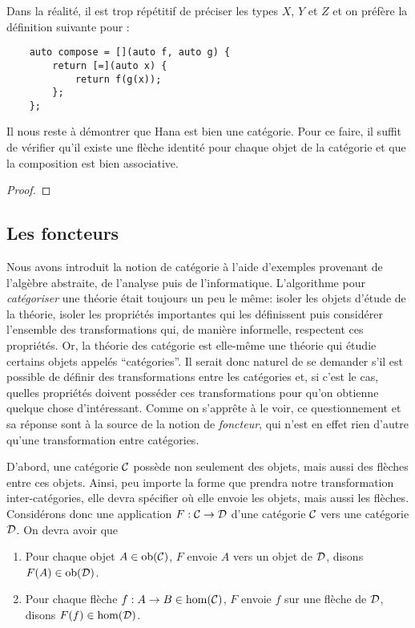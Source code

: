 Dans la réalité, il est trop répétitif de préciser les types $X$, $Y$ et $Z$
et on préfère la définition suivante pour :
\begin{verbatim}
    auto compose = [](auto f, auto g) {
        return [=](auto x) {
            return f(g(x));
        };
    };
\end{verbatim}

Il nous reste à démontrer que Hana est bien une catégorie. Pour ce faire, il
suffit de vérifier qu'il existe une flèche identité pour chaque objet de
la catégorie et que la composition est bien associative.

\begin{proof}

\end{proof}


\subsection{Les foncteurs}
Nous avons introduit la notion de catégorie à l'aide d'exemples provenant de
l'algèbre abstraite, de l'analyse puis de l'informatique. L'algorithme pour
\textit{catégoriser} une théorie était toujours un peu le même: isoler les
objets d'étude de la théorie, isoler les propriétés importantes qui les
définissent puis considérer l'ensemble des transformations qui, de manière
informelle, respectent ces propriétés. Or, la théorie des catégorie est
elle-même une théorie qui étudie certains objets appelés ``catégories''.
Il serait donc naturel de se demander s'il est possible de définir des
transformations entre les catégories et, si c'est le cas, quelles propriétés
doivent posséder ces transformations pour qu'on obtienne quelque chose
d'intéressant. Comme on s'apprête à le voir, ce questionnement et sa
réponse sont à la source de la notion de \textit{foncteur}, qui n'est
en effet rien d'autre qu'une transformation entre catégories.

D'abord, une catégorie $\mathcal{C}$ possède non seulement des objets, mais aussi
des flèches entre ces objets. Ainsi, peu importe la forme que prendra notre
transformation inter-catégories, elle devra spécifier où elle envoie les
objets, mais aussi les flèches. Considérons donc une application $F : \mathcal{C} \to \mathcal{D}$
d'une catégorie $\mathcal{C}$ vers une catégorie $\mathcal{D}$. On devra avoir que
\begin{enumerate}
    \item Pour chaque objet $A \in \mathrm{ob}(\mathcal{C})$, $F$ envoie $A$ vers un objet de
          $\mathcal{D}$, disons $F(A) \in \mathrm{ob}(\mathcal{D})$.
    \item Pour chaque flèche $f : A \to B \in \hom(\mathcal{C})$, $F$ envoie $f$ sur
          une flèche de $\mathcal{D}$, disons $F(f) \in \hom(\mathcal{D})$.
\end{enumerate}

